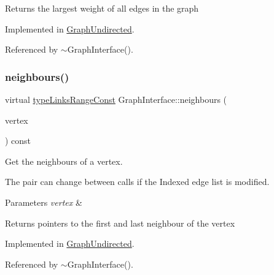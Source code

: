 \begin{DoxyReturn}{Returns}
the largest weight of all edges in the graph 
\end{DoxyReturn}


Implemented in \hyperlink{classGraphUndirected_a7c21f40748eef95d1c35be892ab10ce2}{Graph\+Undirected}.



Referenced by $\sim$\+Graph\+Interface().

\mbox{\label{classGraphInterface_a23e03d032193544c77d04310fe9e4785}} 
\subsubsection{\texorpdfstring{neighbours()}{neighbours()}}
{\footnotesize\ttfamily virtual \hyperlink{graphInterface_8h_ae8d27008f15586bbf419af7ad2e0a48a}{type\+Links\+Range\+Const} Graph\+Interface\+::neighbours (\begin{DoxyParamCaption}\item[{const \hyperlink{edge_8h_a5fbd20c46956d479cb10afc9855223f6}{type\+Vertex} \&}]{vertex }\end{DoxyParamCaption}) const\hspace{0.3cm}{\ttfamily [pure virtual]}}



Get the neighbours of a vertex. 

The pair can change between calls if the Indexed edge list is modified. 
\begin{DoxyParams}{Parameters}
{\em vertex} & \\
\hline
\end{DoxyParams}
\begin{DoxyReturn}{Returns}
pointers to the first and last neighbour of the vertex 
\end{DoxyReturn}


Implemented in \hyperlink{classGraphUndirected_a5c8c85acc5ea87f43ac0dcbde61f06e0}{Graph\+Undirected}.



Referenced by $\sim$\+Graph\+Interface().

\mbox{\label{classGraphInterface_ae9b85226881a84124ce6dbaba498edce}} 
